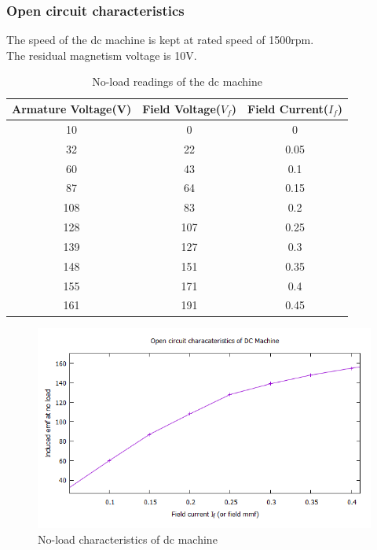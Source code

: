 \documentclass[12pt]{article}
\begin{document}
    \subsubsection{Open circuit characteristics}
    The speed of the dc machine is kept at rated speed of 1500rpm.\\
    The residual magnetism voltage is 10V.
    \begin{table}[ht]
        \centering
        \begin{tabular}{|c|c|c|}
            \hline
            \hline
            Armature Voltage(V) & Field Voltage($V_f$) & Field Current($I_f$) \\
            \hline
            \hline
            10 & 0 & 0 \\
            32	&	22	&	0.05	\\
            60	&	43	&	0.1	\\
            87	&	64	&	0.15	\\
            108	&	83	&	0.2	\\
            128	&	107	&	0.25	\\
            139	&	127	&	0.3	\\
            148	&	151	&	0.35	\\
            155	&	171	&	0.4	\\
            161	&	191	&	0.45	\\
            \hline
        \end{tabular}
        \caption{No-load readings of the dc machine}
        \label{tab:my_label}
    \end{table}
    \vspace{-0.8cm}
    \begin{figure}[ht]
        \centering
        \includegraphics[scale=0.66]{occ.png}
        \caption{No-load characteristics of dc machine}
        \label{fig:my_label}
    \end{figure}
    \newpage
\end{document}
